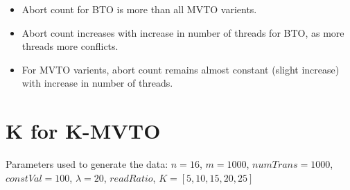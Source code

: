 \documentclass[12pt]{article}
\begin{document}
\begin{itemize}
    \item Abort count for BTO is more than all MVTO varients.
    \item Abort count increases with increase in number of threads for BTO, as more threads more conflicts.
    \item For MVTO varients, abort count remains almost constant (slight increase) with increase in number of threads.
\end{itemize}

\section*{K for K-MVTO}
Parameters used to generate the data:
$n=16$, $m=1000$, $numTrans=1000$, $constVal=100$, $\lambda=20$, $readRatio$, $K = [5, 10, 15, 20, 25]$
\end{document}
